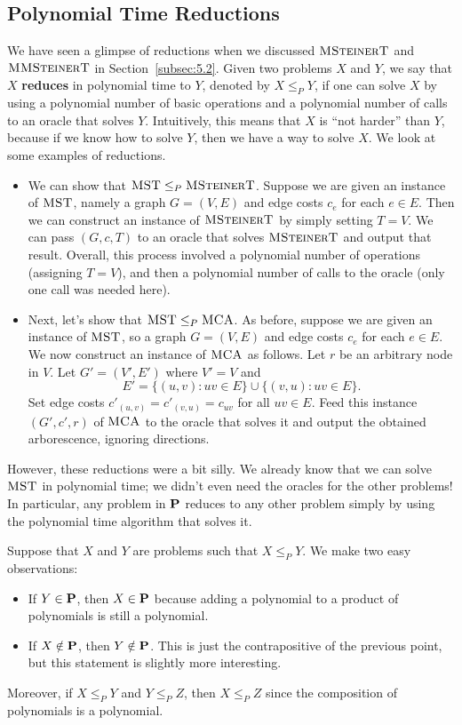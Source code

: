 \subsection{Polynomial Time Reductions} \label{subsec:6.2}
We have seen a glimpse of reductions when we discussed 
$\textsc{MSteinerT}$ and $\textsc{MMSteinerT}$ in Section~\ref{subsec:5.2}. 
Given two problems $X$ and $Y$, we say that $X$ {\bf reduces} in polynomial 
time to $Y$, denoted by $X \leq_P Y$, if one can solve $X$ by using a 
polynomial number of basic operations and a polynomial number of calls 
to an oracle that solves $Y$. Intuitively, this means that $X$ is ``not 
harder'' than $Y$, because if we know how to solve $Y$, then we have 
a way to solve $X$. We look at some examples of reductions.
\begin{itemize}
    \item We can show that $\textsc{MST} \leq_P \textsc{MSteinerT}$. 
    Suppose we are given an instance of $\textsc{MST}$, namely a graph 
    $G = (V, E)$ and edge costs $c_e$ for each $e \in E$. Then we can 
    construct an instance of $\textsc{MSteinerT}$ by simply setting 
    $T = V$. We can pass $(G, c, T)$ to an oracle that solves $\textsc{MSteinerT}$
    and output that result. 
    Overall, this process involved a polynomial number of operations 
    (assigning $T = V$), and then a polynomial number of calls to 
    the oracle (only one call was needed here).

    \item Next, let's show that $\textsc{MST} \leq_P \textsc{MCA}$. As before, 
    suppose we are given an instance of $\textsc{MST}$, so a graph $G = (V, E)$ 
    and edge costs $c_e$ for each $e \in E$. We now construct 
    an instance of $\textsc{MCA}$ as follows. Let $r$ be an 
    arbitrary node in $V$. Let $G' = (V', E')$ where 
    $V' = V$ and 
    \[ E' = \{(u, v) : uv \in E\} \cup \{(v, u) : uv \in E\}. \] 
    Set edge costs $c'_{(u,v)} = c'_{(v,u)} = c_{uv}$ for all $uv \in E$.
    Feed this instance $(G', c', r)$ of $\textsc{MCA}$ to the oracle that 
    solves it and output the obtained arborescence, ignoring directions.
\end{itemize}
However, these reductions were a bit silly. We already know that we can solve 
$\textsc{MST}$ in polynomial time; we didn't even need the oracles for the 
other problems! In particular, any problem in $\mathbf{P}$ reduces to 
any other problem simply by using the polynomial time algorithm that solves it.

Suppose that $X$ and $Y$ are problems such that $X \leq_P Y$. We make two 
easy observations: 
\begin{itemize}
    \item If $Y \in \mathbf{P}$, then $X \in \mathbf{P}$ because adding a polynomial 
    to a product of polynomials is still a polynomial. 
    \item If $X \notin \mathbf{P}$, then $Y \notin \mathbf{P}$. This is just the 
    contrapositive of the previous point, but this statement 
    is slightly more interesting. 
\end{itemize}
Moreover, if $X \leq_P Y$ and $Y \leq_P Z$, then $X \leq_P Z$ since the composition 
of polynomials is a polynomial.

